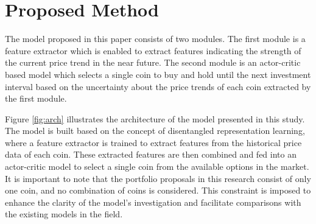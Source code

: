 \section{Proposed Method}
The model proposed in this paper consists of two modules. The first module is a feature extractor which is enabled to extract features indicating the strength of the current price trend in the near future. The second module is an actor-critic based model which selects a single coin to buy and hold until the next investment interval based on the uncertainty about the price trends of each coin extracted by the first module. 

Figure \ref{fig:arch} illustrates the architecture of the model presented in this study. The model is built based on the concept of disentangled representation learning, where a feature extractor is trained to extract features from the historical price data of each coin. These extracted features are then combined and fed into an actor-critic model to select a single coin from the available options in the market. It is important to note that the portfolio proposals in this research consist of only one coin, and no combination of coins is considered. This constraint is imposed to enhance the clarity of the model's investigation and facilitate comparisons with the existing models in the field.



